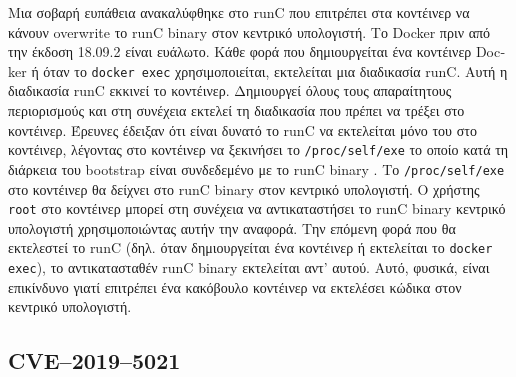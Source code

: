 Mια σοβαρή ευπάθεια ανακαλύφθηκε στο \textlatin{runC} που επιτρέπει στα
κοντέινερ να κάνουν \textlatin{overwrite} το \textlatin{runC binary} στον
κεντρικό υπολογιστή. Το \textlatin{Docker} πριν από την έκδοση 18.09.2 είναι
ευάλωτο. Κάθε φορά που δημιουργείται ένα κοντέινερ \textlatin{Docker} ή όταν το
\texttt{\textlatin{docker exec}} χρησιμοποιείται, εκτελείται μια διαδικασία
\textlatin{runC}. Αυτή η διαδικασία \textlatin{runC} εκκινεί το κοντέινερ.
Δημιουργεί όλους τους απαραίτητους περιορισμούς και στη συνέχεια εκτελεί τη
διαδικασία που πρέπει να τρέξει στο κοντέινερ. Έρευνες έδειξαν ότι είναι δυνατό
το runC να εκτελείται μόνο του στο κοντέινερ, λέγοντας στο κοντέινερ να
ξεκινήσει το \texttt{\textlatin{/proc/self/exe}} το οποίο κατά τη διάρκεια του
\textlatin{bootstrap} είναι συνδεδεμένο με το \textlatin{runC binary}
\cite{CVE-2019-5736-DragonSector} \cite{CVE-2019-5736-Github}. Το
\texttt{\textlatin{/proc/self/exe}} στο κοντέινερ θα δείχνει στο \textlatin{runC
binary} στον κεντρικό υπολογιστή. Ο χρήστης \texttt{\textlatin{root}} στο
κοντέινερ μπορεί στη συνέχεια να αντικαταστήσει το \textlatin{runC binary}
κεντρικό υπολογιστή χρησιμοποιώντας αυτήν την αναφορά. Την επόμενη φορά που θα
εκτελεστεί το \textlatin{runC} (δηλ. όταν δημιουργείται ένα κοντέινερ ή
εκτελείται το \texttt{\textlatin{docker exec}}), το αντικατασταθέν
\textlatin{runC binary} εκτελείται αντ' αυτού. Αυτό, φυσικά, είναι επικίνδυνο
γιατί επιτρέπει ένα κακόβουλο κοντέινερ να εκτελέσει κώδικα στον κεντρικό υπολογιστή.

\subsection{\textlatin{CVE–2019–5021}}
